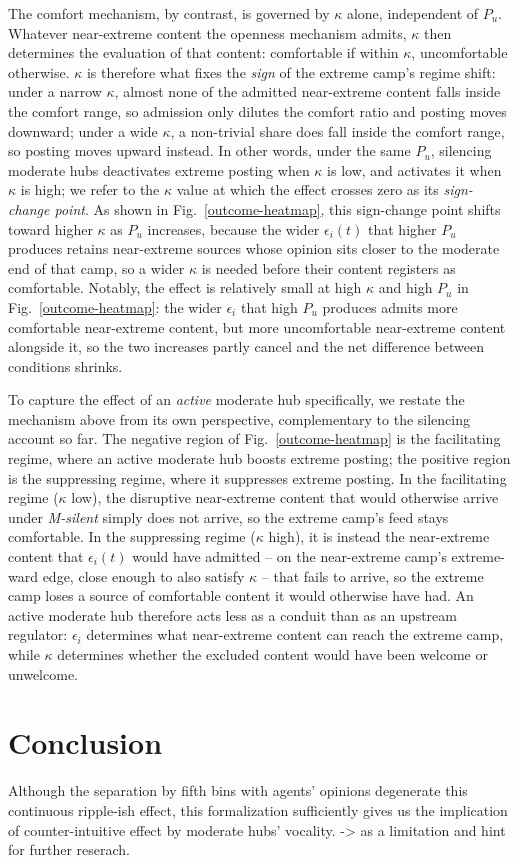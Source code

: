 \documentclass{svproc}
\def\BoundedConfidence{\epsilon} %
\def\VCR{\kappa}                 %
\begin{document}
The comfort mechanism, by contrast, is governed by $\VCR$ alone,
independent of $P_u$. Whatever near-extreme content the openness
mechanism admits, $\VCR$ then determines the evaluation of that
content: comfortable if within $\VCR$, uncomfortable otherwise.
$\VCR$ is therefore what fixes the \emph{sign} of the extreme
camp's regime shift: under a narrow $\VCR$, almost none of the
admitted near-extreme content falls inside the comfort range, so
admission only dilutes the comfort ratio and posting moves
downward; under a wide $\VCR$, a non-trivial share does fall inside
the comfort range, so posting moves upward instead. In other words,
under the same $P_u$, silencing moderate hubs deactivates extreme
posting when $\VCR$ is low, and activates it when $\VCR$ is high; we
refer to the $\VCR$ value at which the effect crosses zero as its
\emph{sign-change point}. As shown in Fig.~\ref{outcome-heatmap},
this sign-change point shifts toward higher $\VCR$ as $P_u$
increases, because the wider $\BoundedConfidence_i(t)$ that higher
$P_u$ produces retains near-extreme sources whose opinion sits
closer to the moderate end of that camp, so a wider $\VCR$ is
needed before their content registers as comfortable. Notably, the
effect is relatively small at high $\VCR$ and high $P_u$ in
Fig.~\ref{outcome-heatmap}: the wider $\BoundedConfidence_i$ that
high $P_u$ produces admits more comfortable near-extreme content,
but more uncomfortable near-extreme content alongside it, so the
two increases partly cancel and the net difference between
conditions shrinks.

To capture the effect of an \emph{active} moderate hub specifically,
we restate the mechanism above from its own perspective,
complementary to the silencing account so far. The negative region
of Fig.~\ref{outcome-heatmap} is the facilitating regime, where an
active moderate hub boosts extreme posting; the positive region is
the suppressing regime, where it suppresses extreme posting. In the
facilitating regime ($\VCR$ low), the disruptive near-extreme
content that would otherwise arrive under \emph{M-silent} simply
does not arrive, so the extreme camp's feed stays comfortable. In
the suppressing regime ($\VCR$ high), it is instead the near-extreme
content that $\BoundedConfidence_i(t)$ would have admitted -- on
the near-extreme camp's extreme-ward edge, close enough to also
satisfy $\VCR$ -- that fails to arrive, so the extreme camp loses a
source of comfortable content it would otherwise have had. An
active moderate hub therefore acts less as a conduit than as an
upstream regulator: $\BoundedConfidence_i$ determines what
near-extreme content can reach the extreme camp, while $\VCR$
determines whether the excluded content would have been welcome or
unwelcome.

\section{Conclusion}\label{sec:conclusion}
Although the separation by fifth bins with agents' opinions 
degenerate this continuous ripple-ish effect, this formalization 
sufficiently gives us the implication of counter-intuitive 
effect by moderate hubs' vocality. -> as a limitation and 
hint for further reserach.



\end{document}
